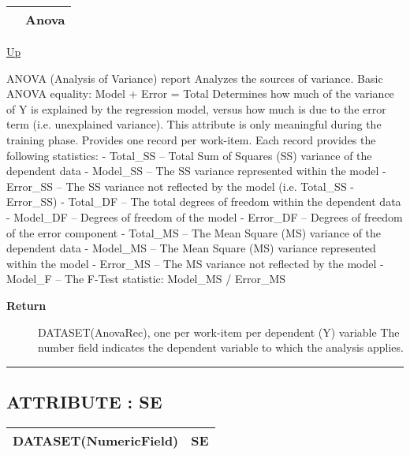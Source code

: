 {\renewcommand{\arraystretch}{1.5}
\begin{tabularx}{\textwidth}{|>{\raggedright\arraybackslash}l|X|}
\hline
\hspace{0pt} & Anova \\
\hline
\end{tabularx}
}

\hyperlink{ecldoc:linearregression.ols}{Up}

\par
ANOVA (Analysis of Variance) report Analyzes the sources of variance. Basic ANOVA equality: Model + Error = Total Determines how much of the variance of Y is explained by the regression model, versus how much is due to the error term (i.e. unexplained variance). This attribute is only meaningful during the training phase. Provides one record per work-item. Each record provides the following statistics: - Total\_SS -- Total Sum of Squares (SS) variance of the dependent data - Model\_SS -- The SS variance represented within the model - Error\_SS -- The SS variance not reflected by the model (i.e. Total\_SS - Error\_SS) - Total\_DF -- The total degrees of freedom within the dependent data - Model\_DF -- Degrees of freedom of the model - Error\_DF -- Degrees of freedom of the error component - Total\_MS -- The Mean Square (MS) variance of the dependent data - Model\_MS -- The Mean Square (MS) variance represented within the model - Error\_MS -- The MS variance not reflected by the model - Model\_F -- The F-Test statistic: Model\_MS / Error\_MS

\par
\begin{description}
\item [\textbf{Return}] DATASET(AnovaRec), one per work-item per dependent (Y) variable The number field indicates the dependent variable to which the analysis applies.
\end{description}

\rule{\textwidth}{0.4pt}
\subsection*{ATTRIBUTE : SE}
\hypertarget{ecldoc:linearregression.ols.se}{}

{\renewcommand{\arraystretch}{1.5}
\begin{tabularx}{\textwidth}{|>{\raggedright\arraybackslash}l|X|}
\hline
\hspace{0pt}DATASET(NumericField) & SE \\
\hline
\end{tabularx}
}

